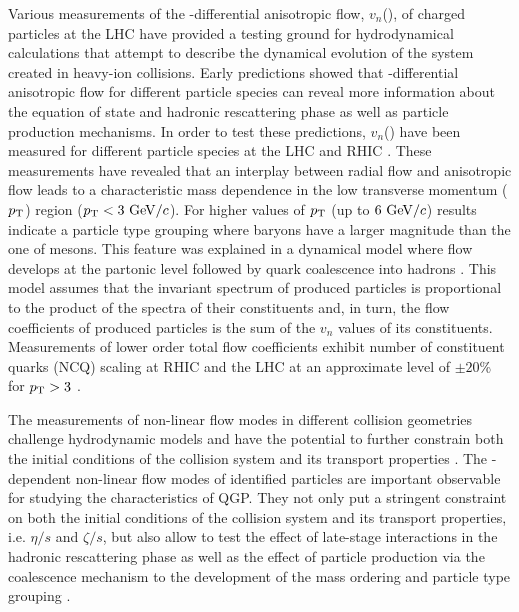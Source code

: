 Various measurements of the \pT-differential anisotropic flow, $v_{n}$(\pT), of charged particles at the LHC \cite{ALICE:2011ab, ATLAS:2012at, Chatrchyan:2013kba, Acharya:2018lmh} have provided a testing ground for hydrodynamical calculations that attempt to describe the dynamical evolution of the system created in heavy-ion collisions. Early predictions showed that \pT-differential anisotropic flow for different particle species can reveal more information about the equation of state and hadronic rescattering phase \cite{Voloshin:1996nv,Huovinen:2001cy} as well as particle production mechanisms. In order to test these predictions, $v_{n}$(\pT) have been measured for different particle species at the LHC \cite{Abelev:2014pua,Adam:2015eta,Adam:2016nfo,Acharya:2018zuq} and RHIC \cite{Adams:2003am,Abelev:2007qg,Adler:2003kt,Adare:2006ti}. These measurements have revealed that an interplay between radial flow and anisotropic flow leads to a characteristic mass dependence in the low transverse momentum ($p_{\rm{T}}$) region ($p_{\rm{T}} < 3~{\rm GeV}/c$). For higher values of $p_{\rm{T}}$ (up to $6~{\rm GeV}/c$) results indicate a particle type grouping where baryons have a larger magnitude than the one of mesons. This feature was explained in a dynamical model where flow develops at the partonic level followed by quark coalescence into hadrons \cite{Voloshin:2002wa,Molnar:2003ff}. This model assumes that the invariant spectrum of produced particles is proportional to the product of the spectra of their constituents and, in turn, the flow coefficients of produced particles is the sum of the $v_{n}$ values of its constituents. Measurements of lower order total flow coefficients exhibit number of constituent quarks (NCQ) scaling at RHIC \cite{Adare:2012vq} and the LHC \cite{Abelev:2014pua,Adam:2016nfo} at an approximate level of $\pm20$\% for $p_{\rm{T}} > 3$ \GeV.

The measurements of non-linear flow modes in different collision geometries challenge hydrodynamic models and have the potential to further constrain both the initial conditions of the collision system and its transport properties \cite{Acharya:2017zfg}. The \pT-dependent non-linear flow modes of identified particles are important observable for studying the characteristics of QGP. They not only put a stringent constraint on both the initial conditions of the collision system and its transport properties, i.e. $\eta/s$ and $\zeta/s$, but also allow to test the effect of late-stage interactions in the hadronic rescattering phase as well as the effect of particle production via the coalescence mechanism to the development of the mass ordering and particle type grouping \cite{ALICE:2011ab,Acharya:2018zuq}.

